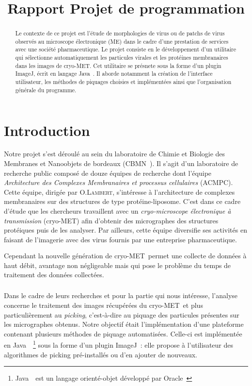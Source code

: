 \documentclass[12pt,a4paper]{report}
\title{Rapport Projet de programmation}
\begin{document}

\newcommand{\cme}{cryo-MET}
\newcommand{\java}{Java~{\tiny \texttrademark}}
\newcommand{\js}{JavaScript}
\newcommand{\imj}{ImageJ}

\begin{abstract}
Le contexte de ce projet est l'étude de morphologies de virus ou de patchs de virus observés au microscope électronique (ME) dans le cadre d'une prestation de services avec une société pharmaceutique. Le projet consiste en le développement d'un utilitaire qui sélectionne automatiquement les particules virales et les protéines membranaires dans les images de \cme. Cet utilitaire se présnete sous la forme d'un plugin \imj, écrit en  langage \java.
Il aborde notamment la création de l'interface utilisateur, les méthodes de piquages choisies et implémentées ainsi que l'organisation générale du programme. 
\end{abstract}

\tableofcontents
\chapter*{Introduction}

Notre projet s'est déroulé au sein du laboratoire de Chimie et Biologie des Membranes et Nanoobjets de bordeaux (CBMN~\cite{cbmn:url}).
Il s'agit d'un laboratoire de recherche public composé de douze équipes de recherche dont l'équipe \emph{Architecture des Complexes Membranaires et processus cellulaires} (ACMPC). %
Cette équipe, dirigée par O.\textsc{Lambert}, s'intéresse à l'architecture de complexes membranaires sur des structures de type protéine-liposome. C'est dans ce cadre d'étude que les chercheurs travaillent avec un \emph{cryo-microscope électronique à transmission} (\cme) afin d'obtenir des micrographes des structures protéiques puis de les analyser. Par ailleurs, cette équipe diversifie ses activités en faisant de l'imagerie avec des virus fournis par une entreprise pharmaceutique.

\noindent
Cependant la nouvelle génération de \cme ~permet une collecte de données à haut débit, avantage non négligeable mais qui pose le problème du temps de traitement des données collectées. %

\paragraph*{}
Dans le cadre de leurs recherches et pour la partie qui nous intéresse, l'analyse concerne le traitement des images récupérées du \cme\ et plus particulièrement au \emph{picking}, c'est-à-dire au piquage des particules présentes sur les micrographes obtenus. %
Notre objectif était l'implémentation d'une plateforme contenant plusieurs méthodes de piquage automatisées.
Celle-ci est implémentée en \java ~\footnote{\java\ est un langage orienté-objet développé par Oracle~\cite{java:url}} sous la forme d'un plugin \imj~\cite{imagej:url}: elle propose à l'utilisateur des algorithmes de picking pré-installés ou d'en ajouter de nouveaux.
\end{document}
